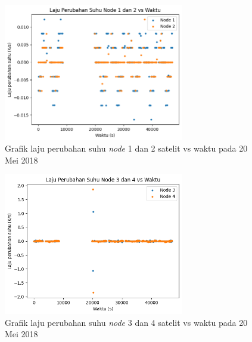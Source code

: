 \begin{figure}[H]
\setlength{}
\begin{center}
\includegraphics[width=0.7\textwidth]{fig/base_node12_tempchange_2018-05-20.png}
	\caption{Grafik laju perubahan suhu \textit{node} 1 dan 2 satelit vs waktu pada 20 Mei 2018}
\label{fig:basetempchange1220}
\end{center}
\end{figure}

\begin{figure}[H]
\setlength{}
\begin{center}
\includegraphics[width=0.7\textwidth]{fig/base_node34_tempchange_2018-05-20.png}
	\caption{Grafik laju perubahan suhu \textit{node} 3 dan 4 satelit vs waktu pada 20 Mei 2018}
\label{fig:basetempchange3420}
\end{center}
\end{figure}

